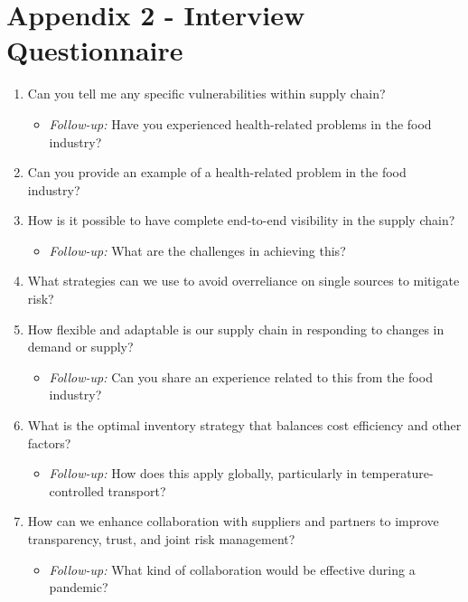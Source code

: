 \chapter{Appendix 2 - Interview Questionnaire}
\label{appendix:interview}

\begin{enumerate}[leftmargin=*, label=\textbf{\arabic*.}]
    \item Can you tell me any specific vulnerabilities within supply chain?
    \begin{itemize}[label=$\rightarrow$]
        \item \textit{Follow-up:} Have you experienced health-related problems in the food industry?
    \end{itemize}

    \item Can you provide an example of a health-related problem in the food industry?

    \item How is it possible to have complete end-to-end visibility in the supply chain?
    \begin{itemize}[label=$\rightarrow$]
        \item \textit{Follow-up:} What are the challenges in achieving this?
    \end{itemize}

    \item What strategies can we use to avoid overreliance on single sources to mitigate risk?

    \item How flexible and adaptable is our supply chain in responding to changes in demand or supply?
    \begin{itemize}[label=$\rightarrow$]
        \item \textit{Follow-up:} Can you share an experience related to this from the food industry?
    \end{itemize}

    \item What is the optimal inventory strategy that balances cost efficiency and other factors?
    \begin{itemize}[label=$\rightarrow$]
        \item \textit{Follow-up:} How does this apply globally, particularly in temperature-controlled transport?
    \end{itemize}

    \item How can we enhance collaboration with suppliers and partners to improve transparency, trust, and joint risk management?
    \begin{itemize}[label=$\rightarrow$]
        \item \textit{Follow-up:} What kind of collaboration would be effective during a pandemic?
    \end{itemize}


\end{enumerate}
